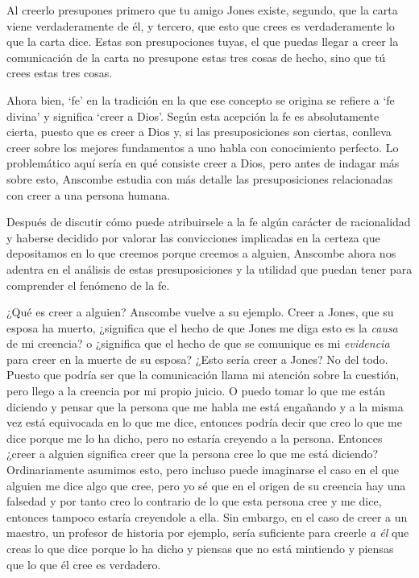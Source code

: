 Al creerlo presupones primero que tu amigo Jones existe, segundo, que la carta viene verdaderamente de él, y tercero, que esto que crees es verdaderamente lo que la carta dice. Estas son presupociones tuyas, el que puedas llegar a creer la comunicación de la carta no presupone estas tres cosas de hecho, sino que tú crees estas tres cosas.

Ahora bien, `fe' en la tradición en la que ese concepto se origina se refiere a `fe divina' y significa `creer a Dios'. Según esta acepción la fe es absolutamente cierta, puesto que es creer a Dios y, si las presuposiciones son ciertas, conlleva creer sobre los mejores fundamentos a uno habla con conocimiento perfecto. Lo problemático aquí sería en qué consiste creer a Dios, pero antes de indagar más sobre esto, Anscombe estudia con más detalle las presuposiciones relacionadas con creer a una persona humana.

Después de discutir cómo puede atribuirsele a la fe algún carácter de racionalidad y haberse decidido por valorar las convicciones implicadas en la certeza que depositamos en lo que creemos porque creemos a alguien, Anscombe ahora nos adentra en el análisis de estas presuposiciones y la utilidad que puedan tener para comprender el fenómeno de la fe.

¿Qué es creer a alguien? Anscombe vuelve a su ejemplo. Creer a Jones, que su esposa ha muerto, ¿significa que el hecho de que Jones me diga esto es la \emph{causa} de mi creencia? o ¿significa que el hecho de que se comunique es mi \emph{evidencia} para creer en la muerte de su esposa? ¿Esto sería creer a Jones? No del todo. Puesto que podría ser que la comunicación llama mi atención sobre la cuestión, pero llego a la creencia por mi propio juicio. O puedo tomar lo que me están diciendo y pensar que la persona que me habla me está engañando y a la misma vez está equivocada en lo que me dice, entonces podría decir que creo lo que me dice porque me lo ha dicho, pero no estaría creyendo a la persona. Entonces ¿creer a alguien significa creer que la persona cree lo que me está diciendo? Ordinariamente asumimos esto, pero incluso puede imaginarse el caso en el que alguien me dice algo que cree, pero yo sé que en el origen de su creencia hay una falsedad y por tanto creo lo contrario de lo que esta persona cree y me dice, entonces tampoco estaría creyendole a ella. Sin embargo, en el caso de creer a un maestro, un profesor de historia por ejemplo, sería suficiente para creerle \emph{a él} que creas lo que dice porque lo ha dicho y piensas que no está mintiendo y piensas que lo que él cree es verdadero.

